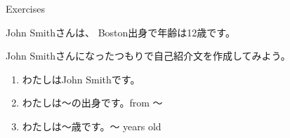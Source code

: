 \documentclass[aspectratio=169,xcolor={dvipsnames,table}]{beamer}
\begin{document}
\begin{frame}[plain,t]{Exercises}

\begin{tcolorbox}[colframe=black,
  colback=Yellow!10!white,
  colbacktitle=Yellow!40!white,
  coltitle=black, %
  title=自己紹介]
John Smithさんは、
Boston出身で年齢は12歳です。

John Smithさんになったつもりで自己紹介文を作成してみよう。
\end{tcolorbox}


\bigskip

\begin{enumerate}
 \item わたしはJohn Smithです。
 \item わたしは〜の出身です。\hfill{}from 〜
 \item わたしは〜歳です。\hfill{}〜 years old
\end{enumerate}

\end{frame}
\end{document}
